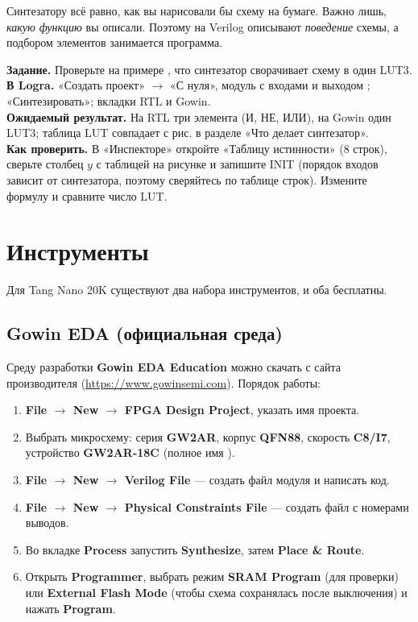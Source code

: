 \begin{ideabox}
Синтезатору всё равно, как вы нарисовали бы схему на бумаге. Важно лишь,
\emph{какую функцию} вы описали. Поэтому на Verilog описывают
\emph{поведение} схемы, а подбором элементов занимается программа.
\end{ideabox}

\begin{diybox}
\textbf{Задание.} Проверьте на примере , что синтезатор сворачивает схему в один LUT3.\\
\textbf{В Logra.} «Создать проект» $\to$ «С нуля», модуль  с входами  и выходом ; «Синтезировать»; вкладки RTL и Gowin.\\
\textbf{Ожидаемый результат.} На RTL три элемента (И, НЕ, ИЛИ), на Gowin один LUT3; таблица LUT совпадает с рис. в разделе «Что делает синтезатор».\\
\textbf{Как проверить.} В «Инспекторе» откройте «Таблицу истинности» (8 строк), сверьте столбец $y$ с таблицей на рисунке и запишите INIT (порядок входов зависит от синтезатора, поэтому сверяйтесь по таблице строк).  Измените формулу и сравните число LUT.
\end{diybox}

\section{Инструменты}

Для Tang Nano 20K существуют два набора инструментов, и оба бесплатны.

\subsection{Gowin EDA (официальная среда)}

Среду разработки \textbf{Gowin EDA Education} можно скачать с сайта
производителя (\url{https://www.gowinsemi.com}). Порядок работы:
\begin{enumerate}
  \item \textbf{File $\to$ New $\to$ FPGA Design Project}, указать имя проекта.
  \item Выбрать микросхему: серия \textbf{GW2AR}, корпус \textbf{QFN88},
        скорость \textbf{C8/I7}, устройство \textbf{GW2AR-18C}
        (полное имя ).
  \item \textbf{File $\to$ New $\to$ Verilog File} --- создать файл модуля
        и написать код.
  \item \textbf{File $\to$ New $\to$ Physical Constraints File} --- создать
        файл  с номерами выводов.
  \item Во вкладке \textbf{Process} запустить \textbf{Synthesize}, затем
        \textbf{Place \& Route}.
  \item Открыть \textbf{Programmer}, выбрать режим \textbf{SRAM Program}
        (для проверки) или \textbf{External Flash Mode} (чтобы схема
        сохранялась после выключения) и нажать \textbf{Program}.
\end{enumerate}

